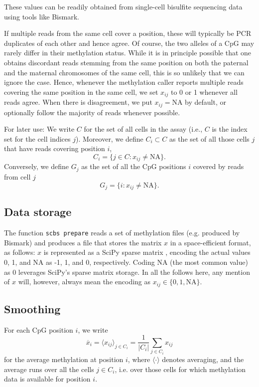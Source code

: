 \documentclass[twocolumn,10pt]{article}
\begin{document}
These values can be readily obtained from single-cell bisulfite sequencing data using tools like Bismark.

If multiple reads from the same cell cover a position, these will typically be PCR duplicates of each other and hence agree. Of course, the two alleles of a CpG may rarely differ in their methylation status. While it is in principle possible that one obtains discordant reads stemming from the same position on both the paternal and the maternal chromosomes of the same cell, this is so unlikely that we can ignore the case. Hence, whenever the methylation caller reports multiple reads covering the same position in the same cell, we set $x_{ij}$ to 0 or 1 whenever all reads agree.
When there is disagreement, we put $x_{ij}=\text{NA}$ by default, or optionally follow the majority of reads whenever possible.

For later use: We write $C$ for the set of all cells in the assay (i.e., $C$ is the index set for the cell indices $j$). Moreover,
we define $C_i\subset C$ as the set of all those cells $j$ that have reads covering position $i$,
$$ C_i=\{j\in C: x_{ij}\neq\text{NA}\}.$$
Conversely, we define $G_j$ as the set of all the CpG positions $i$ covered by reads from cell $j$ 
$$ G_j=\{i: x_{ij}\neq\text{NA}\}.$$

\subsection{Data storage}

The function \texttt{scbs prepare} reads a set of methylation files (e.g. produced by Bismark) and produces a file that stores the matrix $x$ in a space-efficient format, as follows: $x$ is represented as a SciPy sparse matrix \citep{SciPy}, encoding the actual values 0, 1, and NA as -1, 1, and 0, respectively. Coding NA (the most common value) as 0 leverages SciPy's sparse matrix storage. In all the follows here, any mention of $x$ will, however, always mean the encoding as $x_{ij}\in\{0,1,\text{NA}\}$.

\subsection{Smoothing}

For each CpG position $i$, we write 
$$\overline{x}_i=\langle x_{ij} \rangle_{j\in C_i} = \frac{1}{|C_i|}\sum_{j\in C_i} x_{ij}$$ 
for the average methylation at position $i$, where $\langle\cdot\rangle$ denotes averaging, and the average runs over all the cells $j\in C_i$, i.e. over those cells for which methylation data is available for position $i$.
\end{document}
